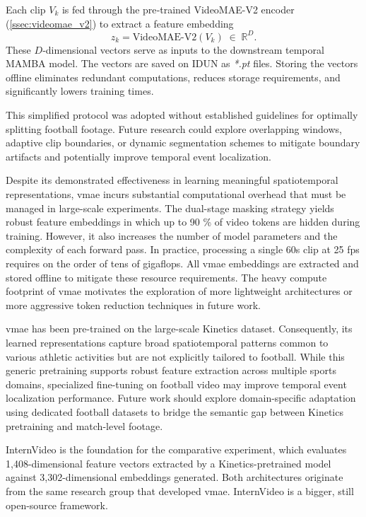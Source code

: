 Each clip $V_k$ is fed through the pre‐trained VideoMAE-V2 encoder (\autoref{ssec:videomae_v2}) to extract a feature embedding
\[
z_k = \mathrm{VideoMAE\text{-}V2}(V_k)\;\in\;\mathbb{R}^D.
\]
These $D$‐dimensional vectors serve as inputs to the downstream temporal MAMBA model. The vectors are saved on IDUN as \textit{*.pt} files. Storing the vectors offline eliminates redundant computations, reduces storage requirements, and significantly lowers training times. 

This simplified protocol was adopted without established guidelines for optimally splitting football footage.  Future research could explore overlapping windows, adaptive clip boundaries, or dynamic segmentation schemes to mitigate boundary artifacts and potentially improve temporal event localization.

Despite its demonstrated effectiveness in learning meaningful spatiotemporal representations, \acrfull{vmae} incurs substantial computational overhead that must be managed in large-scale experiments. The dual-stage masking strategy yields robust feature embeddings in which up to 90 \% of video tokens are hidden during training. However, it also increases the number of model parameters and the complexity of each forward pass. In practice, processing a single 60s clip at 25 fps requires on the order of tens of gigaflops\cite{wang_videomae_2023}. All \acrshort{vmae} embeddings are extracted and stored offline to mitigate these resource requirements. The heavy compute footprint of \acrshort{vmae} motivates the exploration of more lightweight architectures or more aggressive token reduction techniques in future work.

\acrshort{vmae} has been pre-trained on the large-scale Kinetics dataset. Consequently, its learned representations capture broad spatiotemporal patterns common to various athletic activities but are not explicitly tailored to football. While this generic pretraining supports robust feature extraction across multiple sports domains, specialized fine-tuning on football video may improve temporal event localization performance. Future work should explore domain-specific adaptation using dedicated football datasets to bridge the semantic gap between Kinetics pretraining and match-level footage. 

InternVideo is the foundation for the comparative experiment, which evaluates 1,408-dimensional feature vectors extracted by a Kinetics-pretrained model against 3,302-dimensional embeddings generated. Both architectures originate from the same research group that developed \acrshort{vmae}. InternVideo is a bigger, still open-source framework.


